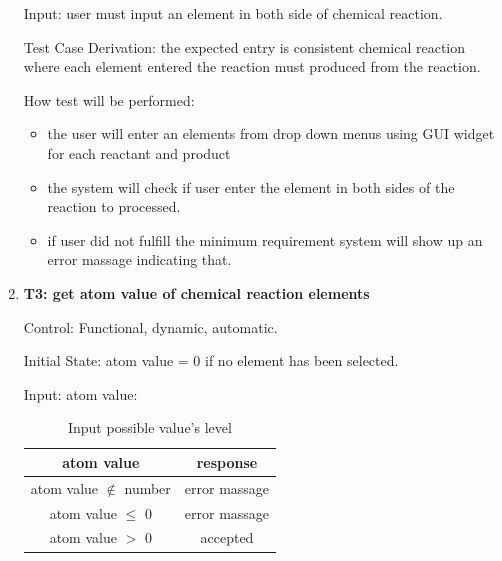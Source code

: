\documentclass[12pt, titlepage]{article}
\begin{document}
\begin{enumerate}
Input: user must input an element in both side of chemical reaction.

\begin{table}[h!]
\centering
{}
\caption{Input possible entries and its corresponding outputs }
\label{tab:reqtrace}
\end{table}

Test Case Derivation: the expected entry is consistent chemical reaction where each element entered the reaction must produced from the reaction. 

How test will be performed: 
\begin{itemize}
\item the user will enter an elements from drop down menus using GUI widget for each reactant and product
\item the system will check if user enter the element in both sides of the reaction to processed. 
\item if user did not fulfill the minimum requirement system will show up an error massage indicating that. 
\end{itemize}

\item{\bf T3: get atom value of chemical reaction elements \\}

Control: Functional, dynamic, automatic.
					
Initial State: atom value = 0 if no element has been selected.
					
Input: 
atom value: 
\begin{table}[h!]
\centering
\begin{tabular}{|c|c|}
\hline
atom value & response  \\
\hline
atom value $\notin$ number  & error massage \\ \hline
atom value $\leq$ 0& error massage \\ \hline
atom value $>$ 0  & accepted\\ \hline
\hline
\end{tabular}
\caption{Input possible value's level }
\label{tab:reqtrace}
\end{table}
	

\end{enumerate}
\end{document}
